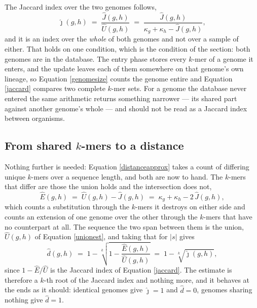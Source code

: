 \documentclass[pdflatex,sn-vancouver-num]{sn-jnl}
\begin{document}
The Jaccard index over the two genomes follows,
%
\begin{equation}
  \widehat{\jmath}(g,h) \;=\; \frac{\widehat{J}(g,h)}{\widehat{U}(g,h)}
  \;=\; \frac{\widehat{J}(g,h)}{\kappa_g + \kappa_h - \widehat{J}(g,h)} ,
  \label{jaccard}
\end{equation}
%
and it is an index over the \emph{whole} of both genomes and not over a sample of either. That holds
on one condition, which is the condition of the section: both genomes are in the database. The entry
phase stores every $k$-mer of a genome it enters, and the update leaves each of them somewhere on
that genome's own lineage, so Equation \eqref{genomesize} counts the genome entire and
Equation \eqref{jaccard} compares two complete $k$-mer sets. For a genome the database never entered
the same arithmetic returns something narrower --- its shared part against another genome's whole ---
and should not be read as a Jaccard index between organisms.

\subsection{From shared $k$-mers to a distance}

Nothing further is needed: Equation \eqref{distanceapprox} takes a count of differing unique
$k$-mers over a sequence length, and both are now to hand. The $k$-mers that differ are those the
union holds and the intersection does not,
%
\begin{equation}
  \widehat{E}(g,h) \;=\; \widehat{U}(g,h) - \widehat{J}(g,h)
  \;=\; \kappa_g + \kappa_h - 2\,\widehat{J}(g,h) ,
  \label{differing}
\end{equation}
%
which counts a substitution through the $k$-mers it destroys on either side and counts an extension
of one genome over the other through the $k$-mers that have no counterpart at all. The sequence the
two span between them is the union, $\widehat{U}(g,h)$ of Equation \eqref{unionest}, and taking that
for $|s|$ gives
%
\begin{equation}
  \widehat{d}(g,h) \;=\; 1 - \sqrt[k]{1 - \frac{\widehat{E}(g,h)}{\widehat{U}(g,h)}}
  \;=\; 1 - \sqrt[k]{\widehat{\jmath}(g,h)} ,
  \label{pairdist}
\end{equation}
%
since $1 - \widehat{E}/\widehat{U}$ is the Jaccard index of Equation \eqref{jaccard}. The estimate is
therefore a $k$-th root of the Jaccard index and nothing more, and it behaves at the ends as it
should: identical genomes give $\widehat{\jmath} = 1$ and $\widehat{d} = 0$, genomes sharing nothing
give $\widehat{d} = 1$.
\end{document}
